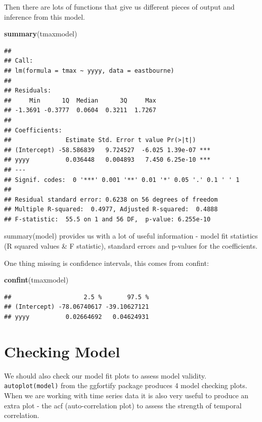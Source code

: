 \documentclass[]{book}
\newenvironment{Shaded}{\begin{snugshade}}{\end{snugshade}}
\newcommand{\KeywordTok}[1]{\textcolor[rgb]{0.13,0.29,0.53}{\textbf{#1}}}
\newcommand{\NormalTok}[1]{#1}
\begin{document}
Then there are lots of functions that give us different pieces of output and inference from this model.

\begin{Shaded}
\begin{Highlighting}[]
\KeywordTok{summary}\NormalTok{(tmaxmodel)}
\end{Highlighting}
\end{Shaded}

\begin{verbatim}
## 
## Call:
## lm(formula = tmax ~ yyyy, data = eastbourne)
## 
## Residuals:
##     Min      1Q  Median      3Q     Max 
## -1.3691 -0.3777  0.0604  0.3211  1.7267 
## 
## Coefficients:
##               Estimate Std. Error t value Pr(>|t|)    
## (Intercept) -58.586839   9.724527  -6.025 1.39e-07 ***
## yyyy          0.036448   0.004893   7.450 6.25e-10 ***
## ---
## Signif. codes:  0 '***' 0.001 '**' 0.01 '*' 0.05 '.' 0.1 ' ' 1
## 
## Residual standard error: 0.6238 on 56 degrees of freedom
## Multiple R-squared:  0.4977, Adjusted R-squared:  0.4888 
## F-statistic:  55.5 on 1 and 56 DF,  p-value: 6.255e-10
\end{verbatim}

summary(model) provides us with a lot of useful information - model fit statistics (R squared values \& F statistic), standard errors and p-values for the coefficients.

One thing missing is confidence intervals, this comes from confint:

\begin{Shaded}
\begin{Highlighting}[]
\KeywordTok{confint}\NormalTok{(tmaxmodel)}
\end{Highlighting}
\end{Shaded}

\begin{verbatim}
##                    2.5 %       97.5 %
## (Intercept) -78.06740617 -39.10627121
## yyyy          0.02664692   0.04624931
\end{verbatim}

\hypertarget{checking-model}{%
\section{Checking Model}\label{checking-model}}

We should also check our model fit plots to assess model validity.
\texttt{autoplot(model)} from the ggfortify package produces 4 model checking plots. When we are working with time series data it is also very useful to produce an extra plot - the acf (auto-correlation plot) to assess the strength of temporal correlation.
\end{document}
